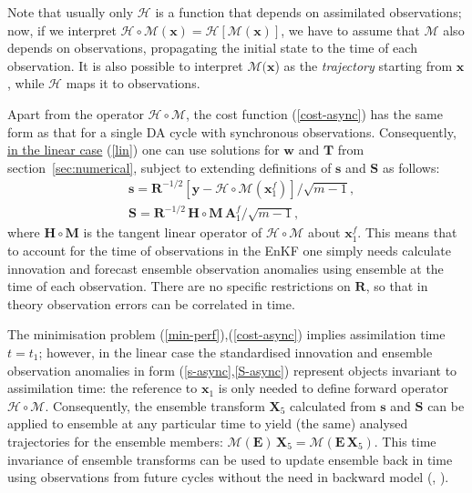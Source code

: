 \documentclass[11pt]{report}
\newcommand{\mb} {\mathbf}
\begin{document}
Note that usually only $\mathcal H$ is a function that depends on assimilated observations; now, if we interpret $\mathcal H \circ \mathcal M (\mb x) = \mathcal H[\mathcal M(\mb x)]$, we have to assume that $\mathcal M$ also depends on observations, propagating the initial state to the time of each observation.
It is also possible to interpret $\mathcal M(\mb x$) as the \emph{trajectory} starting from $\mb x$, while $\mathcal H$ maps it to observations.

Apart from the operator $\mathcal H \circ \mathcal M$, the cost function (\ref{cost-async}) has the same form as that for a single DA cycle with synchronous observations.
Consequently, \underline{in the linear case} (\ref{lin}) one can use solutions for $\mb w$ and $\mb T$ from section~\ref{sec:numerical}, subject to extending definitions of $\mb s$ and $\mb S$ as follows:
\begin{align}
  \label{s-async}
  &\mb s = \mb R^{-1/2} \left[ \mb y - \mathcal H \circ \mathcal M (\mb x_1^f) \right] / \sqrt{m - 1},\\
  \label{S-async}
  &\mb S = \mb R^{-1/2} \, \mb H \circ \mb M \, \mb A_1^f / \sqrt{m - 1},
\end{align}
where $\mb H \circ \mb M$ is the tangent linear operator of $\mathcal H \circ \mathcal M$ about $\mb x_1^f$.
This means that to account for the time of observations in the EnKF one simply needs calculate innovation and forecast ensemble observation anomalies using ensemble at the time of each observation.
There are no specific restrictions on $\mb R$, so that in theory observation errors can be correlated in time.

The minimisation problem (\ref{min-perf}),(\ref{cost-async}) implies assimilation time $t = t_1$; however, in the linear case the standardised innovation and ensemble observation anomalies in form (\ref{s-async},\ref{S-async}) represent objects invariant to assimilation time: the reference to $\mb x_1$ is only needed to define forward operator $\mathcal H \circ \mathcal M$.
Consequently, the ensemble transform $\mb X_5$ calculated from $\mb s$ and $\mb S$ can be applied to ensemble at any particular time to yield (the same) analysed trajectories for the ensemble members: $\mathcal M (\mb E) \, \mb X_5 = \mathcal M (\mb E \, \mb X_5)$.
This time invariance of ensemble transforms can be used to update ensemble back in time using observations from future cycles without the need in backward model (\citealt[][sec.~6]{eve00a}, \citealt[][app.~D]{eve03a}).
\end{document}
